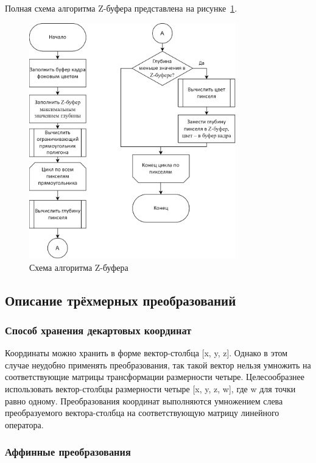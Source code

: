 Полная схема алгоритма Z-буфера представлена на  рисунке~\ref{fig:z-buffer}.

\begin{figure}[h]
	\centering
	\includegraphics[width=0.8\textwidth]{img/algorithms/alg-z-buffer.png}
	\caption{Схема алгоритма Z-буфера}
	\label{fig:z-buffer}
\end{figure}
\clearpage

\subsection{Описание трёхмерных преобразований}
\subsubsection{Способ хранения декартовых координат}
Координаты можно хранить в форме вектор-столбца [x, y, z].
Однако в этом случае неудобно применять преобразования, так такой вектор нельзя умножить на соответствующие матрицы трансформации размерности четыре.
Целесообразнее использовать вектор-столбцы размерности четыре [x, y, z, w], где w для точки равно одному.
Преобразования координат выполняются умножением слева преобразуемого вектора-столбца на соответствующую матрицу линейного оператора.

\subsubsection{Аффинные преобразования}

